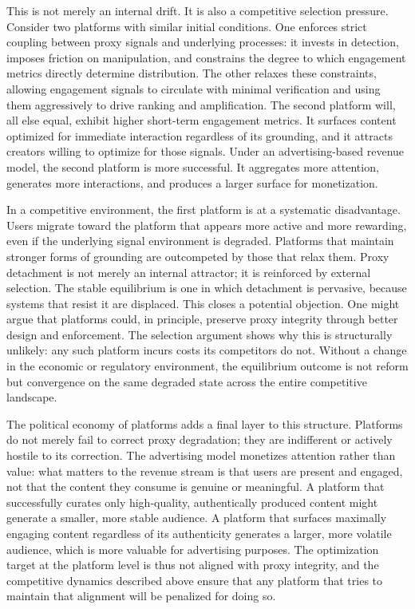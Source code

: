 \documentclass[12pt, a4paper]{article}
\begin{document}
This is not merely an internal drift. It is also a competitive selection pressure. Consider two platforms with similar initial conditions. One enforces strict coupling between proxy signals and underlying processes: it invests in detection, imposes friction on manipulation, and constrains the degree to which engagement metrics directly determine distribution. The other relaxes these constraints, allowing engagement signals to circulate with minimal verification and using them aggressively to drive ranking and amplification. The second platform will, all else equal, exhibit higher short-term engagement metrics. It surfaces content optimized for immediate interaction regardless of its grounding, and it attracts creators willing to optimize for those signals. Under an advertising-based revenue model, the second platform is more successful. It aggregates more attention, generates more interactions, and produces a larger surface for monetization.

In a competitive environment, the first platform is at a systematic disadvantage. Users migrate toward the platform that appears more active and more rewarding, even if the underlying signal environment is degraded. Platforms that maintain stronger forms of grounding are outcompeted by those that relax them. Proxy detachment is not merely an internal attractor; it is reinforced by external selection. The stable equilibrium is one in which detachment is pervasive, because systems that resist it are displaced. This closes a potential objection. One might argue that platforms could, in principle, preserve proxy integrity through better design and enforcement. The selection argument shows why this is structurally unlikely: any such platform incurs costs its competitors do not. Without a change in the economic or regulatory environment, the equilibrium outcome is not reform but convergence on the same degraded state across the entire competitive landscape.

The political economy of platforms adds a final layer to this structure. Platforms do not merely fail to correct proxy degradation; they are indifferent or actively hostile to its correction. The advertising model monetizes attention rather than value: what matters to the revenue stream is that users are present and engaged, not that the content they consume is genuine or meaningful. A platform that successfully curates only high-quality, authentically produced content might generate a smaller, more stable audience. A platform that surfaces maximally engaging content regardless of its authenticity generates a larger, more volatile audience, which is more valuable for advertising purposes. The optimization target at the platform level is thus not aligned with proxy integrity, and the competitive dynamics described above ensure that any platform that tries to maintain that alignment will be penalized for doing so.
\end{document}

